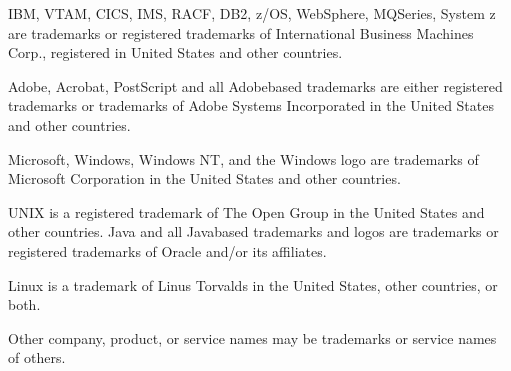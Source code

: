 \documentclass[letterpaper,10pt,english]{sphinxmanual}
\begin{document}
\sphinxAtStartPar
IBM, VTAM, CICS, IMS, RACF, DB2, z/OS, WebSphere, MQSeries, System z are trademarks or registered trademarks of
International Business Machines Corp., registered in United States and other countries.

\sphinxAtStartPar
Adobe, Acrobat, PostScript and all Adobe\sphinxhyphen{}based trademarks are either registered trademarks or trademarks of Adobe
Systems Incorporated in the United States and other countries.

\sphinxAtStartPar
Microsoft, Windows, Windows NT, and the Windows logo are trademarks of Microsoft Corporation in the United States
and other countries.

\sphinxAtStartPar
UNIX is a registered trademark of The Open Group in the United States and other countries.
Java and all Java\sphinxhyphen{}based trademarks and logos are trademarks or registered trademarks of Oracle and/or its affiliates.

\sphinxAtStartPar
Linux is a trademark of Linus Torvalds in the United States, other countries, or both.

\sphinxAtStartPar
Other company, product, or service names may be trademarks or service names of others.



\renewcommand{\indexname}{Index}
\printindex
\end{document}
